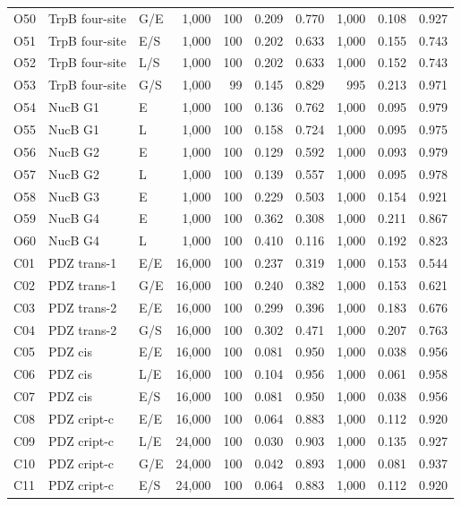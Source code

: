 \begin{longtable}[c]{lllrrrrrrr}
O50 & TrpB four-site & G/E & 1,000 & 100 & 0.209 & 0.770 & 1,000 & 0.108 & 0.927 \\
O51 & TrpB four-site & E/S & 1,000 & 100 & 0.202 & 0.633 & 1,000 & 0.155 & 0.743 \\
O52 & TrpB four-site & L/S & 1,000 & 100 & 0.202 & 0.633 & 1,000 & 0.152 & 0.743 \\
O53 & TrpB four-site & G/S & 1,000 & 99 & 0.145 & 0.829 & 995 & 0.213 & 0.971 \\
O54 & NucB G1 & E & 1,000 & 100 & 0.136 & 0.762 & 1,000 & 0.095 & 0.979 \\
O55 & NucB G1 & L & 1,000 & 100 & 0.158 & 0.724 & 1,000 & 0.095 & 0.975 \\
O56 & NucB G2 & E & 1,000 & 100 & 0.129 & 0.592 & 1,000 & 0.093 & 0.979 \\
O57 & NucB G2 & L & 1,000 & 100 & 0.139 & 0.557 & 1,000 & 0.095 & 0.978 \\
O58 & NucB G3 & E & 1,000 & 100 & 0.229 & 0.503 & 1,000 & 0.154 & 0.921 \\
O59 & NucB G4 & E & 1,000 & 100 & 0.362 & 0.308 & 1,000 & 0.211 & 0.867 \\
O60 & NucB G4 & L & 1,000 & 100 & 0.410 & 0.116 & 1,000 & 0.192 & 0.823 \\
C01 & PDZ trans-1 & E/E & 16,000 & 100 & 0.237 & 0.319 & 1,000 & 0.153 & 0.544 \\
C02 & PDZ trans-1 & G/E & 16,000 & 100 & 0.240 & 0.382 & 1,000 & 0.153 & 0.621 \\
C03 & PDZ trans-2 & E/E & 16,000 & 100 & 0.299 & 0.396 & 1,000 & 0.183 & 0.676 \\
C04 & PDZ trans-2 & G/S & 16,000 & 100 & 0.302 & 0.471 & 1,000 & 0.207 & 0.763 \\
C05 & PDZ cis & E/E & 16,000 & 100 & 0.081 & 0.950 & 1,000 & 0.038 & 0.956 \\
C06 & PDZ cis & L/E & 16,000 & 100 & 0.104 & 0.956 & 1,000 & 0.061 & 0.958 \\
C07 & PDZ cis & E/S & 16,000 & 100 & 0.081 & 0.950 & 1,000 & 0.038 & 0.956 \\
C08 & PDZ cript-c & E/E & 16,000 & 100 & 0.064 & 0.883 & 1,000 & 0.112 & 0.920 \\
C09 & PDZ cript-c & L/E & 24,000 & 100 & 0.030 & 0.903 & 1,000 & 0.135 & 0.927 \\
C10 & PDZ cript-c & G/E & 24,000 & 100 & 0.042 & 0.893 & 1,000 & 0.081 & 0.937 \\
C11 & PDZ cript-c & E/S & 24,000 & 100 & 0.064 & 0.883 & 1,000 & 0.112 & 0.920 \\

\end{longtable}
